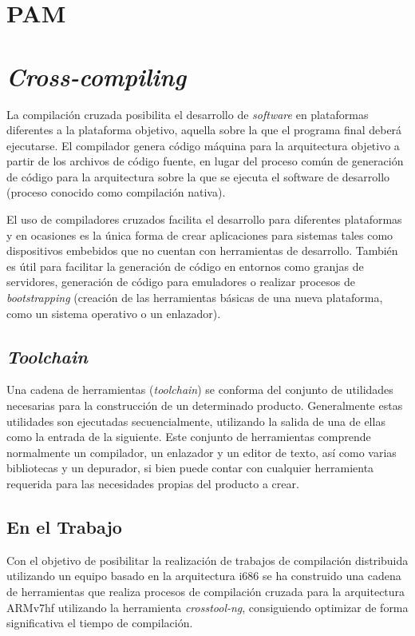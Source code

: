 \section{PAM}




\section{\textit{Cross-compiling}}

La compilación cruzada posibilita el desarrollo de \textit{software} en plataformas diferentes a la plataforma objetivo, aquella sobre la que el programa final deberá ejecutarse. El compilador genera código máquina para la arquitectura objetivo a partir de los archivos de código fuente, en lugar del proceso común de generación de código para la arquitectura sobre la que se ejecuta el software de desarrollo (proceso conocido como compilación nativa).

El uso de compiladores cruzados facilita el desarrollo para diferentes plataformas y en ocasiones es la única forma de crear aplicaciones para sistemas tales como dispositivos embebidos que no cuentan con herramientas de desarrollo. También es útil para facilitar la generación de código en entornos como granjas de servidores, generación de código para emuladores o realizar procesos de \textit{bootstrapping} (creación de las herramientas básicas de una nueva plataforma, como un sistema operativo o un enlazador).

\subsection{\textit{Toolchain}}

Una cadena de herramientas (\textit{toolchain}) se conforma del conjunto de utilidades necesarias para la construcción de un determinado producto. Generalmente estas utilidades son ejecutadas secuencialmente, utilizando la salida de una de ellas como la entrada de la siguiente. Este conjunto de herramientas comprende normalmente un compilador, un enlazador y un editor de texto, así como varias bibliotecas y un depurador, si bien puede contar con cualquier herramienta requerida para las necesidades propias del producto a crear.

\subsection{En el Trabajo}

Con el objetivo de posibilitar la realización de trabajos de compilación distribuida utilizando un equipo basado en la arquitectura i686 %
se ha construido una cadena de herramientas que realiza procesos de compilación cruzada para la arquitectura ARMv7hf utilizando la herramienta \textit{crosstool-ng}\citationneeded, consiguiendo optimizar de forma significativa el tiempo de compilación.

